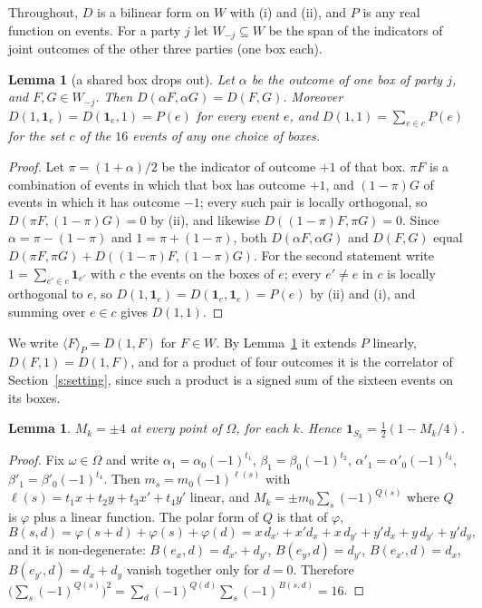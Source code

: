 \documentclass[11pt,a4paper]{article}
\newtheorem{lemma}[theorem]{Lemma}
\theoremstyle{definition}
\theoremstyle{remark}
\newcommand{\ind}[1]{\mathbf{1}_{#1}}
\newcommand{\ev}[1]{\langle #1\rangle_P}
\begin{document}
Throughout, $D$ is a bilinear form on $W$ with (i) and (ii), and $P$ is any real function on events.
For a party $j$ let $W_{-j}\subseteq W$ be the span of the indicators of joint outcomes of the other
three parties (one box each).

\begin{lemma}[a shared box drops out]\label{l:rule}
Let $\alpha$ be the outcome of one box of party $j$, and $F,G\in W_{-j}$. Then
$D(\alpha F,\alpha G)=D(F,G)$. Moreover $D(1,\ind e)=D(\ind e,1)=P(e)$ for every event $e$, and
$D(1,1)=\sum_{e\in c}P(e)$ for the set $c$ of the $16$ events of any one choice of boxes.
\end{lemma}

\begin{proof}
Let $\pi=(1+\alpha)/2$ be the indicator of outcome $+1$ of that box. $\pi F$ is a combination of events
in which that box has outcome $+1$, and $(1-\pi)G$ of events in which it has outcome $-1$; every such
pair is locally orthogonal, so $D(\pi F,(1-\pi)G)=0$ by (ii), and likewise $D((1-\pi)F,\pi G)=0$. Since
$\alpha=\pi-(1-\pi)$ and $1=\pi+(1-\pi)$, both $D(\alpha F,\alpha G)$ and $D(F,G)$ equal
$D(\pi F,\pi G)+D((1-\pi)F,(1-\pi)G)$. For the second statement write $1=\sum_{e'\in c}\ind{e'}$ with
$c$ the events on the boxes of $e$; every $e'\ne e$ in $c$ is locally orthogonal to $e$, so
$D(1,\ind e)=D(\ind e,\ind e)=P(e)$ by (ii) and (i), and summing over $e\in c$ gives $D(1,1)$.
\end{proof}

We write $\ev F=D(1,F)$ for $F\in W$. By Lemma~\ref{l:rule} it extends $P$ linearly, $D(F,1)=D(1,F)$,
and for a product of four outcomes it is the correlator of Section~\ref{s:setting}, since such a product
is a signed sum of the sixteen events on its boxes.

\begin{lemma}\label{l:bent}
$M_k=\pm4$ at every point of $\Omega$, for each $k$. Hence $\ind{S_k}=\tfrac12(1-M_k/4)$.
\end{lemma}

\begin{proof}
Fix $\omega\in\Omega$ and write $\alpha_1=\alpha_0(-1)^{t_1}$, $\beta_1=\beta_0(-1)^{t_2}$,
$\alpha'_1=\alpha'_0(-1)^{t_3}$, $\beta'_1=\beta'_0(-1)^{t_4}$. Then $m_s=m_0(-1)^{\ell(s)}$ with
$\ell(s)=t_1x+t_2y+t_3x'+t_4y'$ linear, and $M_k=\pm m_0\sum_s(-1)^{Q(s)}$ where $Q$ is $\varphi$ plus
a linear function. The polar form of $Q$ is that of $\varphi$,
\[
B(s,d)=\varphi(s+d)+\varphi(s)+\varphi(d)=x\,d_{x'}+x'd_x+x\,d_{y'}+y'd_x+y\,d_{y'}+y'd_y ,
\]
and it is non-degenerate: $B(e_x,d)=d_{x'}+d_{y'}$, $B(e_y,d)=d_{y'}$, $B(e_{x'},d)=d_x$,
$B(e_{y'},d)=d_x+d_y$ vanish together only for $d=0$. Therefore
$\bigl(\sum_s(-1)^{Q(s)}\bigr)^2=\sum_d(-1)^{Q(d)}\sum_s(-1)^{B(s,d)}=16$.
\end{proof}
\end{document}
